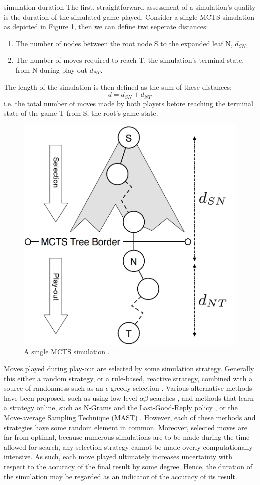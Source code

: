 \documentclass{ecai2014}
\newcommand{\node}[1]{{\fontfamily{phv}\selectfont#1}}
\begin{document}
{\sc simulation duration} The first, straightforward assessment of a simulation's quality is the duration of the simulated game played. Consider a single MCTS simulation as depicted in Figure \ref{fig:mcts-simulation}, then we can define two seperate distances: 
\begin{enumerate}
\item The number of nodes between the root node \node{S} to the expanded leaf \node{N}, $d_{SN}$,
\item The number of moves required to reach \node{T}, the simulation's terminal state, from \node{N} during play-out $d_{NT}$.
\end{enumerate}
The length of the simulation is then defined as the sum of these distances:
\begin{equation}
d = d_{SN} + d_{NT}
\label{eq:m_ST}
\end{equation}
i.e. the total number of moves made by both players before reaching the terminal state of the game \node{T} from \node{S}, the root's game state.
\begin{figure}[t]
	\centering
	\includegraphics[width=.3\textwidth]{img/figure2_new.png}
	\caption{A single MCTS simulation \cite{finnsson2010learning}.}
	\label{fig:mcts-simulation}
\end{figure}
Moves played during play-out are selected by some simulation strategy. Generally this either a random strategy, or a rule-based, reactive strategy, combined with a source of randomness such as an $\epsilon$-greedy selection \cite{sturtevant2008analysis,sutton1998reinforcement}. Various alternative methods have been proposed, such as using low-level $\alpha\beta$ searches \cite{Winands2011}, and methods that learn a strategy online, such as N-Grams and the Last-Good-Reply policy \cite{Tak2012}, or the Move-average Sampling Technique (MAST) \cite{finnsson2008simulation}. However, each of these methods and strategies have some random element in common. Moreover, selected moves are far from optimal, because numerous simulations are to be made during the time allowed for search, any selection strategy cannot be made overly computationally intensive. As such, each move played ultimately increases uncertainty with respect to the accuracy of the final result by some degree. Hence, the duration of the simulation may be regarded as an indicator of the accuracy of its result.
\end{document}
